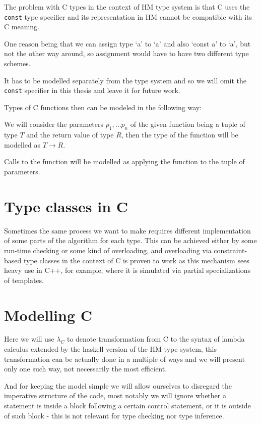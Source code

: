 The problem with C types in the context of HM type system is that C uses the \lstinline{const} type specifier and its representation in HM cannot be compatible with its C meaning.

One reason being that we can assign type `a' to `a' and also `const a' to `a', but not the other way around, so assignment would have to have two different type schemes.

It has to be modelled separately from the type system and so we will omit the \lstinline{const} specifier in this thesis and leave it for future work. %

Types of C functions then can be modeled in the following way:

We will consider the parameters $p_1, \dots p_n$ of the given function being a tuple of type $T$ and the return value of type $R$, then the type of the function will be modelled as $T \rightarrow R$.

Calls to the function will be modelled as applying the function to the tuple of parameters.


\section{Type classes in C}

Sometimes the same process we want to make requires different implementation of some parts of the algorithm for each type. This can be achieved either by some run-time checking or some kind of overloading, and overloading via constraint-based type classes in the context of C is proven to work as this mechanism sees heavy use in C++, for example,
where it is simulated via partial specializations of templates.


\section{Modelling C}

Here we will use $\lambda_C$ to denote transformation from C to the syntax of lambda calculus extended by the haskell version of the HM type system, this transformation can be actually done in a multiple of ways and we will present only one such way, not necessarily the most efficient.

And for keeping the model simple we will allow ourselves to disregard the imperative structure of the code, most notably we will ignore whether a statement is inside a block following a certain control statement, or it is outside of such block - this is not relevant for type checking nor type inference.

